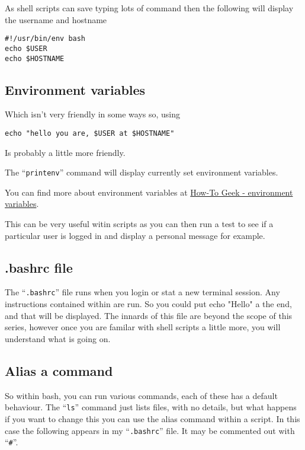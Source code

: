 \documentclass{book}
\begin{document}
As shell scripts can save typing lots of command then the following will display the username and hostname

\begin{verbatim}
#!/usr/bin/env bash
echo $USER
echo $HOSTNAME
\end{verbatim}

\subsection{Environment variables}

Which isn't very friendly in some ways so, using
\begin{verbatim}
echo "hello you are, $USER at $HOSTNAME"
\end{verbatim}
Is probably a little more friendly.

The ``\verb|printenv|'' command will display currently set environment variables.

You can find more about environment variables at \href{https://www.howtogeek.com/668503/how-to-set-environment-variables-in-bash-on-linux/}{How-To Geek - environment variables}.

This can be very useful witin scripts as you can then run a test to see if a particular user is logged in and display a personal message for example.

\subsection{.bashrc file}

The ``\verb|.bashrc|'' file runs when you login or stat a new terminal session. Any instructions contained within are run. So you could put echo "Hello" a the end, and that will be displayed. The innards of this file are beyond the scope of this series, however once you are familar with shell scripts a little more, you will understand what is going on.

\subsection{Alias a command}

So within bash, you can run various commands, each of these has a default behaviour. The ``\verb|ls|'' command just lists files, with no details, but what happens if you want to change this you can use the alias command within a script.  In this case the following appears in my ``\verb|.bashrc|'' file. It may be commented out with ``\verb|#|''.
\end{document}

